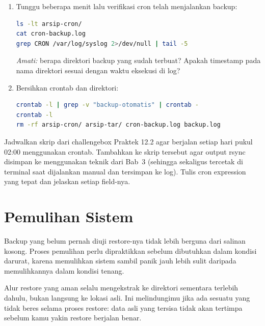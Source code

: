 \begin{enumerate}
    \item Tunggu beberapa menit lalu verifikasi cron telah menjalankan backup:
\begin{lstlisting}[language=bash, caption={Verifikasi eksekusi otomatis cron}]
ls -lt arsip-cron/
cat cron-backup.log
grep CRON /var/log/syslog 2>/dev/null | tail -5
\end{lstlisting}
    \textit{Amati:} berapa direktori backup yang sudah terbuat? Apakah timestamp
    pada nama direktori sesuai dengan waktu eksekusi di log?

    \item Bersihkan crontab dan direktori:
\begin{lstlisting}[language=bash, caption={Membersihkan crontab dan hasil backup}]
crontab -l | grep -v "backup-otomatis" | crontab -
crontab -l
rm -rf arsip-cron/ arsip-tar/ cron-backup.log backup.log
\end{lstlisting}
\end{enumerate}

\begin{challengebox}
Jadwalkan skrip  dari challengebox Praktek 12.2
agar berjalan setiap hari pukul 02:00 menggunakan crontab. Tambahkan ke skrip
tersebut agar output rsync disimpan ke  menggunakan
teknik  dari Bab~3 (sehingga sekaligus tercetak di terminal saat
dijalankan manual dan tersimpan ke log). Tulis cron expression yang tepat dan
jelaskan setiap field-nya.
\end{challengebox}

\section{Pemulihan Sistem}
\label{sec:backup-recovery}

Backup yang belum pernah diuji restore-nya tidak lebih berguna dari salinan
kosong. Proses pemulihan perlu dipraktikkan sebelum dibutuhkan dalam kondisi
darurat, karena memulihkan sistem sambil panik jauh lebih sulit daripada
memulihkannya dalam kondisi tenang.

Alur restore yang aman selalu mengekstrak ke direktori sementara terlebih dahulu,
bukan langsung ke lokasi asli. Ini melindungimu jika ada sesuatu yang tidak
beres selama proses restore: data asli yang tersisa tidak akan tertimpa sebelum
kamu yakin restore berjalan benar.

